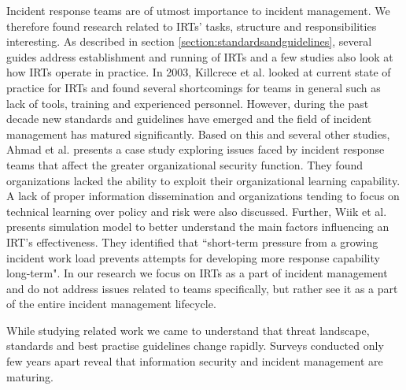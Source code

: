 Incident response teams are of utmost importance to incident management. We therefore found research related to \acp{IRT}' tasks, structure and responsibilities interesting. As described in section \ref{section:standardsandguidelines}, several guides address establishment and running of \acp{IRT} and a few studies also look at how \acp{IRT} operate in practice. In 2003, Killcrece et al. \cite{killcrece2003state} looked at current state of practice for \acp{IRT} and found several shortcomings for teams in general such as lack of tools, training and experienced personnel. However, during the past decade new standards and guidelines have emerged and the field of incident management has matured significantly.  Based on this and several other studies, Ahmad et al. presents a case study exploring issues faced by incident response teams that affect the greater organizational security function. They found organizations lacked the ability to exploit their organizational learning capability. A lack of proper information dissemination and organizations tending to focus on technical learning over policy and risk were also discussed. Further, Wiik et al. \cite{gonzalezlimits} presents simulation model to better understand the main factors influencing an \ac{IRT}'s effectiveness. They identified that ``short-term pressure from a growing incident work load prevents attempts for developing more response capability long-term". In our research we focus on \acp{IRT} as a part of incident management and do not address issues related to teams specifically, but rather see it as a part of the entire incident management lifecycle.

While studying related work we came to understand that threat landscape, standards and best practise guidelines change rapidly. Surveys conducted only few years apart reveal that information security and incident management are maturing. 

